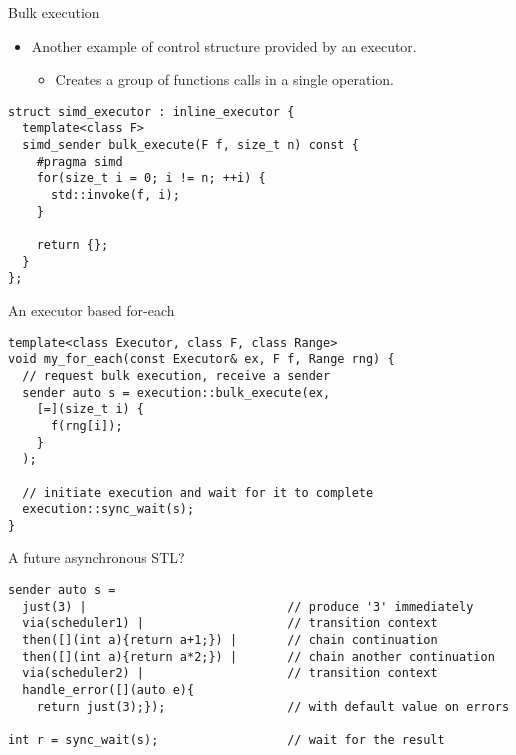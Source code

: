 \begin{frame}[t,fragile]{Bulk execution}
\begin{itemize}
\item Another example of control structure provided by
      an executor.
  \begin{itemize}
    \item Creates a group of functions calls in a single operation.
  \end{itemize}
\end{itemize}
\begin{lstlisting}
struct simd_executor : inline_executor { 
  template<class F>
  simd_sender bulk_execute(F f, size_t n) const {
    #pragma simd
    for(size_t i = 0; i != n; ++i) {
      std::invoke(f, i);
    }

    return {};
  }
};
\end{lstlisting}
\end{frame}

\begin{frame}[t,fragile]{An executor based for-each}
\begin{lstlisting}
template<class Executor, class F, class Range>
void my_for_each(const Executor& ex, F f, Range rng) {
  // request bulk execution, receive a sender
  sender auto s = execution::bulk_execute(ex, 
    [=](size_t i) {
      f(rng[i]);
    }
  );

  // initiate execution and wait for it to complete
  execution::sync_wait(s);
}
\end{lstlisting}
\end{frame}

\begin{frame}[t,fragile]{A future asynchronous STL?}
\begin{lstlisting}
sender auto s = 
  just(3) |                            // produce '3' immediately
  via(scheduler1) |                    // transition context
  then([](int a){return a+1;}) |       // chain continuation
  then([](int a){return a*2;}) |       // chain another continuation
  via(scheduler2) |                    // transition context
  handle_error([](auto e){
    return just(3);});                 // with default value on errors

int r = sync_wait(s);                  // wait for the result
\end{lstlisting}
\end{frame}

